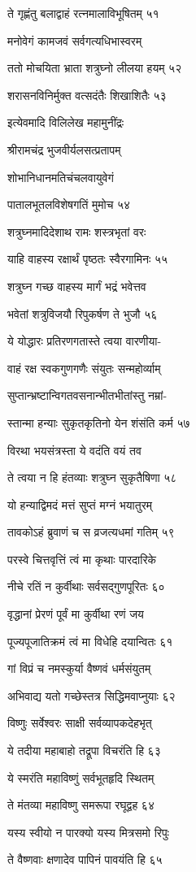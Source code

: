 ते गृह्णंतु बलाद्वाहं रत्नमालाविभूषितम् ५१

मनोवेगं कामजवं सर्वगत्यधिभास्वरम्

ततो मोचयिता भ्राता शत्रुघ्नो लीलया हयम् ५२

शरासनविनिर्मुक्त वत्सदंतैः शिखाशितैः ५३

इत्येवमादि विलिलेख महामुनींद्रः

श्रीरामचंद्र भुजवीर्यलसत्प्रतापम्

शोभानिधानमतिचंचलवायुवेगं

पातालभूतलविशेषगतिं मुमोच ५४

शत्रुघ्नमादिदेशाथ रामः शस्त्रभृतां वरः

याहि वाहस्य रक्षार्थं पृष्ठतः स्वैरगामिनः ५५

शत्रुघ्न गच्छ वाहस्य मार्गं भद्रं भवेत्तव

भवेतां शत्रुविजयौ रिपुकर्षण ते भुजौ ५६

ये योद्धारः प्रतिरणगतास्ते त्वया वारणीया-

वाहं रक्ष स्वकगुणगणैः संयुतः सन्महोर्व्याम्

सुप्तान्भ्रष्टान्विगतवसनान्भीतभीतांस्तु नम्रां-

स्तान्मा हन्याः सुकृतकृतिनो येन शंसंति कर्म ५७

विरथा भयसंत्रस्ता ये वदंति वयं तव

ते त्वया न हि हंतव्याः शत्रुघ्न सुकृतैषिणा ५८

यो हन्याद्विमदं मत्तं सुप्तं मग्नं भयातुरम्

तावकोऽहं ब्रुवाणं च स व्रजत्यधमां गतिम् ५९

परस्वे चित्तवृत्तिं त्वं मा कृथाः पारदारिके

नीचे रतिं न कुर्वीथाः सर्वसद्गुणपूरितः ६०

वृद्धानां प्रेरणं पूर्वं मा कुर्वीथा रणं जय

पूज्यपूजातिक्रमं त्वं मा विधेहि दयान्वितः ६१

गां विप्रं च नमस्कुर्या वैष्णवं धर्मसंयुतम्

अभिवाद्य यतो गच्छेस्तत्र सिद्धिमवाप्नुयाः ६२

विष्णुः सर्वेश्वरः साक्षी सर्वव्यापकदेहभृत्

ये तदीया महाबाहो तद्रूपा विचरंति हि ६३

ये स्मरंति महाविष्णुं सर्वभूतहृदि स्थितम्

ते मंतव्या महाविष्णु समरूपा रघूद्वह ६४

यस्य स्वीयो न पारक्यो यस्य मित्रसमो रिपुः

ते वैष्णवाः क्षणादेव पापिनं पावयंति हि ६५


